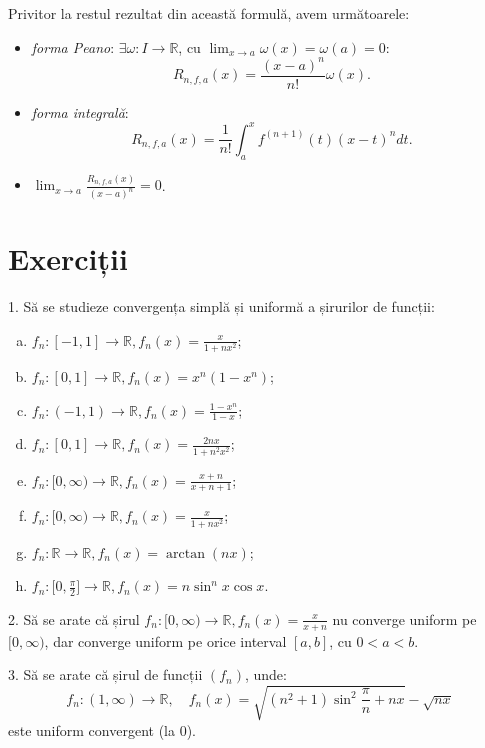 \documentclass[11pt,a4paper]{article}
\newcommand\ds{\displaystyle}
\newcommand\RR{\mathbb{R}}
\theoremstyle{dotless}
\theoremstyle{dotlessdr}
\begin{document}
Privitor la restul rezultat din această formulă, avem următoarele:
\begin{itemize}
\item \emph{forma Peano}: $\exists \omega : I \to \RR$, cu
  $\ds\lim_{x \to a} \omega(x) = \omega(a) = 0$:
  \[
    R_{n, f, a}(x) = \frac{(x - a)^n}{n!} \omega(x).
  \]
\item \emph{forma integrală}:
  \[
    R_{n, f, a}(x) = \frac{1}{n!} \int_a^x f^{(n + 1)}(t) (x - t)^n dt.
  \]
\item $\ds\lim_{x \to a} \frac{R_{n, f, a}(x)}{(x - a)^n} = 0$.
\end{itemize}


\section{Exerciții}
\label{sec:exercitii}

1. Să se studieze convergența simplă și uniformă a șirurilor de funcții:
\begin{enumerate}[(a)]
\item $f_n : [-1, 1] \to \RR, f_n(x) = \frac{x}{1 + nx^2}$;
\item $f_n : [0, 1] \to \RR, f_n(x) = x^n(1 - x^n)$;
\item $f_n : (-1, 1) \to \RR, f_n(x) = \frac{1 - x^n}{1 - x}$;
\item $f_n : [0, 1] \to \RR, f_n(x) = \frac{2nx}{1 + n^2 x^2}$;
\item $f_n : [0, \infty) \to \RR, f_n(x) = \frac{x + n}{x + n + 1}$;
\item $f_n : [0, \infty) \to \RR, f_n(x) = \frac{x}{1 + nx^2}$;
\item $f_n : \RR \to \RR, f_n(x) = \arctan (nx)$;
\item $f_n : \big[ 0, \frac{\pi}{2} \big] \to \RR, f_n(x) = n \sin^n x \cos x$.
\end{enumerate}

\vspace{1cm}

2. Să se arate că șirul $f_n : [0, \infty) \to \RR, f_n(x) = \frac{x}{x + n}$ nu converge
uniform pe $[0, \infty)$, dar converge uniform pe orice interval $[a, b]$, cu $0 < a < b$.

\vspace{1cm}

3. Să se arate că șirul de funcții $(f_n)$, unde:
\[
  f_n : (1, \infty) \to \RR, \quad f_n(x) = \sqrt{(n^2 + 1) \sin^2 \frac{\pi}{n} + nx} - \sqrt{nx}
\]
este uniform convergent (la 0).
\end{document}
